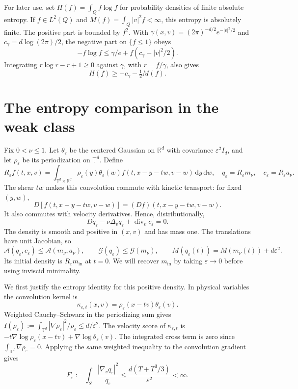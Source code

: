 \documentclass[11pt]{article}
\newcommand{\T}{\mathbb T}
\newcommand{\R}{\mathbb R}
\newcommand{\dd}{\,\mathrm d}
\newcommand{\mi}{m_{\mathrm{in}}}
\newcommand{\A}{\mathcal A}
\newcommand{\G}{\mathcal G}
\newcommand{\D}{D}
\begin{document}
For later use, set $H(f)=\int_Q f\log f$ for probability densities of
finite absolute entropy. If $f\in L^2(Q)$ and
$M(f)=\int_Q|v|^2f<\infty$, this entropy is absolutely finite.
The positive part is bounded by $f^2$. With
$\gamma(x,v)=(2\pi)^{-d/2}e^{-|v|^2/2}$ and
$c_\gamma=d\log(2\pi)/2$, the negative part on $\{f\leq1\}$ obeys
\[
 -f\log f\leq\gamma/e+f(c_\gamma+|v|^2/2).
\]
Integrating $r\log r-r+1\geq0$ against $\gamma$, with $r=f/\gamma$,
also gives
\begin{equation}\label{eq:entropy-lower}
 H(f)\geq-c_\gamma-\tfrac12M(f).
\end{equation}

\section{The entropy comparison in the weak class}

Fix $0<\nu\leq1$. Let $\theta_\varepsilon$ be the centered Gaussian
on $\R^d$ with covariance $\varepsilon^2I_d$, and let
$\rho_\varepsilon$ be its periodization on $\T^d$. Define
\begin{equation}\label{eq:shear-convolution}
 R_\varepsilon f(t,x,v)=
 \int_{\T^d\times\R^d}
 \rho_\varepsilon(y)\theta_\varepsilon(w)
 f(t,x-y-tw,v-w)\dd y\dd w,
 \quad
 q_\varepsilon=R_\varepsilon m_\nu,\quad
 c_\varepsilon=R_\varepsilon a_\nu .
\end{equation}
The shear $tw$ makes this convolution commute with kinetic transport:
for fixed $(y,w)$,
\[
 \D[f(t,x-y-tw,v-w)]=(\D f)(t,x-y-tw,v-w).
\]
It also commutes with velocity derivatives. Hence, distributionally,
\begin{equation}\label{eq:smoothed-pde}
 \D q_\varepsilon-\nu\Delta_vq_\varepsilon
 +\operatorname{div}_vc_\varepsilon=0.
\end{equation}
The density is smooth and positive in $(x,v)$ and has mass one.
The translations have unit Jacobian, so
\begin{equation}\label{eq:smoothed-bounds}
 \A(q_\varepsilon,c_\varepsilon)\leq\A(m_\nu,a_\nu),\qquad
 \G(q_\varepsilon)\leq\G(m_\nu),\qquad
 M(q_\varepsilon(t))=M(m_\nu(t))+d\varepsilon^2 .
\end{equation}
Its initial density is $R_\varepsilon\mi$ at $t=0$.
We will recover $\mi$ by taking $\varepsilon\to0$ before using
inviscid minimality.

We first justify the entropy identity for this positive density.
In physical variables the convolution kernel is
\[
 \kappa_{\varepsilon,t}(x,v)
 =\rho_\varepsilon(x-tv)\theta_\varepsilon(v).
\]
Weighted Cauchy--Schwarz in the periodizing sum gives
$I(\rho_\varepsilon):=\int_{\T^d}
|\nabla\rho_\varepsilon|^2/\rho_\varepsilon\leq d/\varepsilon^2$.
The velocity score of $\kappa_{\varepsilon,t}$ is
$-t\nabla\log\rho_\varepsilon(x-tv)+\nabla\log\theta_\varepsilon(v)$.
The integrated cross term is zero since
$\int_{\T^d}\nabla\rho_\varepsilon=0$.
Applying the same weighted inequality to the convolution gradient gives
\begin{equation}\label{eq:fisher}
 F_\varepsilon:=\int_S\frac{|\nabla_vq_\varepsilon|^2}{q_\varepsilon}
 \leq\frac{d(T+T^3/3)}{\varepsilon^2}<\infty .
\end{equation}
\end{document}
